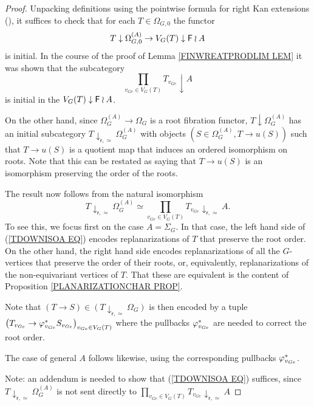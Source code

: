 \documentclass[a4paper,10pt]{article}%
\begin{document}
\begin{proof}
	Unpacking definitions using the pointwise formula for right  Kan extensions (\cite[X.3.1]{McL}), 
	it suffices to check that for each $T \in \Omega_{G,0}$ the functor
	\begin{equation}\label{LANPULLCOMA EQ}
	T \downarrow \Omega_{G,0}^{(A)}
	\to 
	V_G(T) \downarrow \mathsf{F} \wr A
	\end{equation}
is initial.
In the course of the proof of Lemma \ref{FINWREATPRODLIM LEM}
it was shown that the subcategory
\[
\prod_{v_{Ge} \in V_G(T)} 
T_{v_{Ge}} \downarrow A
\]
is initial in the $V_G(T) \downarrow \mathsf{F} \wr A$.

On the other hand, since $\Omega_G^{(A)} \to \Omega_G$ is a root fibration functor, 
$T \downarrow \Omega_{G}^{(A)}$
has an initial subcategory 
$T \downarrow_{\mathsf{r},\simeq} \Omega_{G}^{(A)}$
with objects
$(S \in \Omega_G^{(A)},T \to u(S))$
such that 
$T \to u(S)$
is a quotient map that induces an ordered isomorphism on roots. Note that this can be restated as saying that 
$T \to u(S)$ is an isomorphism preserving the order of the roots.


The result now follows from the natural isomorphism
\begin{equation}\label{TDOWNISOA EQ}
	T \downarrow_{\mathsf{r},\simeq} \Omega_{G}^{(A)} 
\simeq
	\prod_{v_{Ge} \in V_G(T)}
	{T_{v_{Ge}} \downarrow_{\mathsf{r},\simeq} A}.
\end{equation}
To see this, we focus first on the case $A = \Sigma_G$.
In that case, the left hand side of (\ref{TDOWNISOA EQ}) encodes replanarizations of $T$ that preserve the root order.
On the other hand, the right hand side encodes replanarizations of all the $G$-vertices that preserve the order of their roots, or, equivalently, replanarizations of the non-equivariant vertices of $T$.
That these are equivalent is the content of Proposition \ref{PLANARIZATIONCHAR PROP}.

Note that $(T \to S) \in (T \downarrow_{\mathsf{r},\simeq} \Omega_{G})$ is then encoded by a tuple
$\left(T_{v_{Ge}} \to \varphi^{\**}_{v_{Ge}} S_{v_{Ge}}\right)_
{v_{Ge} \in V_G(T)}$
where the pullbacks $\varphi^{\**}_{v_{Ge}}$ are needed to correct the root order.

The case of general $A$ follows likewise, 
using the corresponding pullbacks
$\varphi^{\**}_{v_{Ge}}$.

{\color{red} Note: an addendum is needed to show that (\ref{TDOWNISOA EQ}) suffices, since $T \downarrow_{\mathsf{r},\simeq} \Omega_{G}^{(A)}$ is not sent directly to
 $\prod_{v_{Ge} \in V_G(T)}
	{T_{v_{Ge}} \downarrow_{\mathsf{r},\simeq} A}$}
\end{proof}
\end{document}
